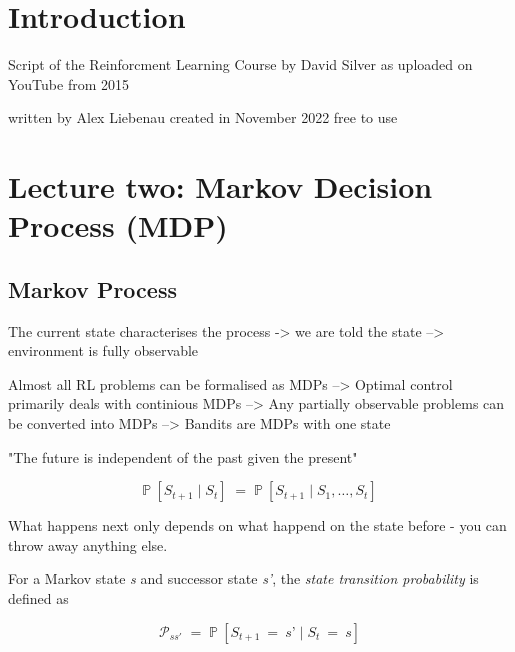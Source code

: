 \documentclass[10pt]{article}
\begin{document}
\tableofcontents
\section{Introduction}

Script of the Reinforcment Learning Course by David Silver
as uploaded on YouTube from 2015

written by Alex Liebenau \newline
created in November 2022 \newline
free to use \newline
\newpage
\section{Lecture two: Markov Decision Process (MDP)}
\subsection{Markov Process}

The current state characterises the process -> we are told the state --> environment is fully observable\newline

Almost all RL problems can be formalised as MDPs\newline
--> Optimal control primarily deals with continious MDPs\newline
--> Any partially observable problems can be converted into MDPs\newline
--> Bandits are MDPs with one state\newline

"The future is independent of the past given the present"

\begin{equation}
	\mathbb{P} \: [S_{t+1}\; | \; S_{t}] \; = \; \mathbb{P} \: [S_{t+1} \; | \; S_{1}, \ldots , S_{t}]
\end{equation}


What happens next only depends on what happend on the state before - you can throw away anything else.\newline

For a Markov state \textit{s} and successor state \textit{s'}, the \textit{state transition probability} is defined as

\begin{equation}
\mathcal{P}_{ss'} \; = \; \mathbb{P}\:[S_{t+1}\:=\:\textit{s'}\; | \; S_{t}\:=\:\textit{s}]
\end{equation}
\end{document}

